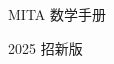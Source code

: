 


\begin{center}
	\vspace*{\fill}
	\titlefontE
	\par\Huge MITA 数学手册
	\par\Large 2025 招新版
	\vspace*{\fill}
\end{center}

\newpage
